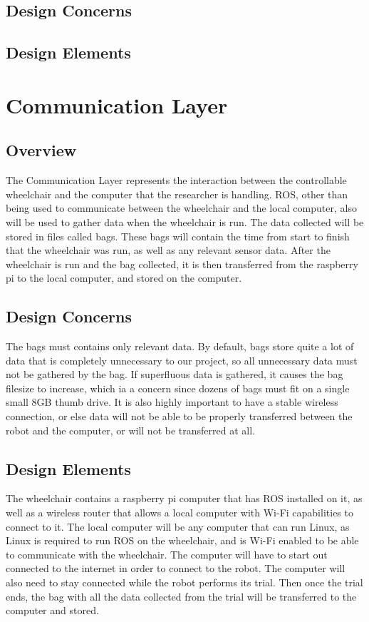\documentclass[onecolumn, draftclsnofoot,10pt, compsoc]{IEEEtran}
\begin{document}
\subsection{Design Concerns}

\subsection{Design Elements}

\section{Communication Layer}

\subsection{Overview}
The Communication Layer represents the interaction between the controllable wheelchair and the computer that the researcher is handling.  ROS, other than being used to communicate between the wheelchair and the local computer, also will be used to gather data when the wheelchair is run. The data collected will be stored in files called bags. These bags will contain the time from start to finish that the wheelchair was run, as well as any relevant sensor data. After the wheelchair is run and the bag collected, it is then transferred from the raspberry pi to the local computer, and stored on the computer.

\subsection{Design Concerns}
The bags must contains only relevant data. By default, bags store quite a lot of data that is completely unnecessary to our project, so all unnecessary data must not be gathered by the bag. If superfluous data is gathered, it causes the bag filesize to increase, which ia a concern since dozens of bags must fit on a single small 8GB thumb drive. It is also highly important to have a stable wireless connection, or else data will not be able to be properly transferred between the robot and the computer, or will not be transferred at all.

\subsection{Design Elements}
The wheelchair contains a raspberry pi computer that has ROS installed on it, as well as a wireless router that allows a local computer with Wi-Fi capabilities to connect to it. The local computer will be any computer that can run Linux, as Linux is required to run ROS on the wheelchair, and is Wi-Fi enabled to be able to communicate with the wheelchair. The computer will have to start out connected to the internet in order to connect to the robot. The computer will also need to stay connected while the robot performs its trial. Then once the trial ends, the bag with all the data collected from the trial will be transferred to the computer and stored.
\end{document}
